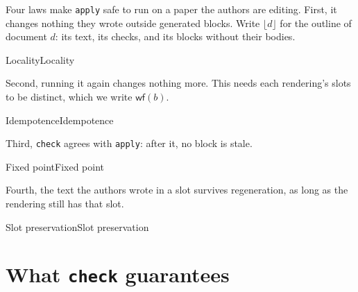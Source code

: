 \documentclass[acmsmall,screen,review,anonymous,nonacm]{acmart}
\begin{document}
Four laws make \verb|apply| safe to run on a paper the authors are editing.
First, it changes nothing they wrote outside generated blocks. Write
$\lfloor d \rfloor$ for the outline of document $d$: its text, its checks,
and its blocks without their bodies.

\begin{leantheorem}[sum=Ud2Z56iQ-4]{Locality}{Locality}
\label{thm:Locality}
\end{leantheorem}

Second, running it again changes nothing more. This needs each rendering's
slots to be distinct, which we write $\mathsf{wf}(b)$.

\begin{leantheorem}[sum=EY5olH0hBV]{Idempotence}{Idempotence}
\label{thm:Idempotence}
\end{leantheorem}

Third, \verb|check| agrees with \verb|apply|: after it, no block is stale.

\begin{leantheorem}[sum=oZMp8ct0Im]{Fixed point}{Fixed point}
\label{thm:Fixed-point}
\end{leantheorem}

Fourth, the text the authors wrote in a slot survives regeneration, as long
as the rendering still has that slot.

\begin{leantheorem}[sum=4WbuqUPxi1]{Slot preservation}{Slot preservation}
\label{thm:Slot-preservation}
\end{leantheorem}

\section{What \texttt{check} guarantees}
\label{sec:check}
\end{document}
